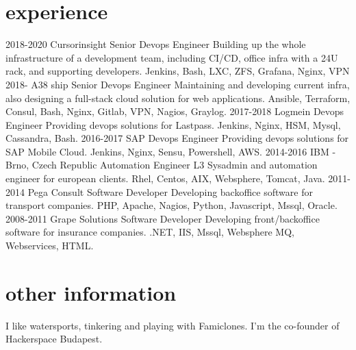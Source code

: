 \documentclass[]{twentysecondcv}
\begin{document}
\section{experience}

\begin{twenty}
  \twentyitem
    {2018-2020}
    {Cursorinsight}
    {Senior Devops Engineer}
    {Building up the whole infrastructure of a development team, including CI/CD, office infra with a 24U rack, and supporting developers. Jenkins, Bash, LXC, ZFS, Grafana, Nginx, VPN}
  \twentyitem
    {2018-}
    {A38 ship}
    {Senior Devops Engineer}
    {Maintaining and developing current infra, also designing a full-stack cloud solution for web applications. Ansible, Terraform, Consul, Bash, Nginx, Gitlab, VPN, Nagios, Graylog.}
\twentyitem
    {2017-2018}
    {Logmein}
    {Devops Engineer}
    {Providing devops solutions for Lastpass. Jenkins, Nginx, HSM, Mysql, Cassandra, Bash.}
\twentyitem
    {2016-2017}
    {SAP}
    {Devops Engineer}
    {Providing devops solutions for SAP Mobile Cloud. Jenkins, Nginx, Sensu, Powershell, AWS.}
\twentyitem
    {2014-2016}
    {IBM - Brno, Czech Republic}
    {Automation Engineer}
    {L3 Sysadmin and automation engineer for european clients. Rhel, Centos, AIX, Websphere, Tomcat, Java.}
\twentyitem
    {2011-2014}
    {Pega Consult}
    {Software Developer}
    {Developing backoffice software for transport companies. PHP, Apache, Nagios, Python, Javascript, Mssql, Oracle.}
\twentyitem
    {2008-2011}
    {Grape Solutions}
    {Software Developer}
    {Developing front/backoffice software for insurance companies. .NET, IIS, Mssql, Websphere MQ, Webservices, HTML.}

\end{twenty}
\section{other information}
I like watersports, tinkering and playing with Famiclones. I'm the co-founder of Hackerspace Budapest.

\end{document}
